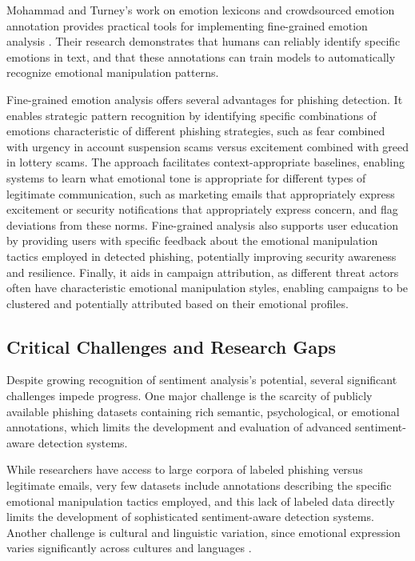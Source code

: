 Mohammad and Turney's work on emotion lexicons and crowdsourced emotion annotation provides practical tools for implementing fine-grained emotion analysis \cite{mohammad2013crowdsourcing}. Their research demonstrates that humans can reliably identify specific emotions in text, and that these annotations can train models to automatically recognize emotional manipulation patterns.

Fine-grained emotion analysis offers several advantages for phishing detection. It enables strategic pattern recognition by identifying specific combinations of emotions characteristic of different phishing strategies, such as fear combined with urgency in account suspension scams versus excitement combined with greed in lottery scams. The approach facilitates context-appropriate baselines, enabling systems to learn what emotional tone is appropriate for different types of legitimate communication, such as marketing emails that appropriately express excitement or security notifications that appropriately express concern, and flag deviations from these norms. Fine-grained analysis also supports user education by providing users with specific feedback about the emotional manipulation tactics employed in detected phishing, potentially improving security awareness and resilience. Finally, it aids in campaign attribution, as different threat actors often have characteristic emotional manipulation styles, enabling campaigns to be clustered and potentially attributed based on their emotional profiles.

\subsection{Critical Challenges and Research Gaps}

Despite growing recognition of sentiment analysis's potential, several significant challenges impede progress. One major challenge is the scarcity of publicly available phishing datasets containing rich semantic, psychological, or emotional annotations, which limits the development and evaluation of advanced sentiment-aware detection systems.

While researchers have access to large corpora of labeled phishing versus legitimate emails, very few datasets include annotations describing the specific emotional manipulation tactics employed, and this lack of labeled data directly limits the development of sophisticated sentiment-aware detection systems. Another challenge is cultural and linguistic variation, since emotional expression varies significantly across cultures and languages \cite{mohammad2016sentiment}. 

